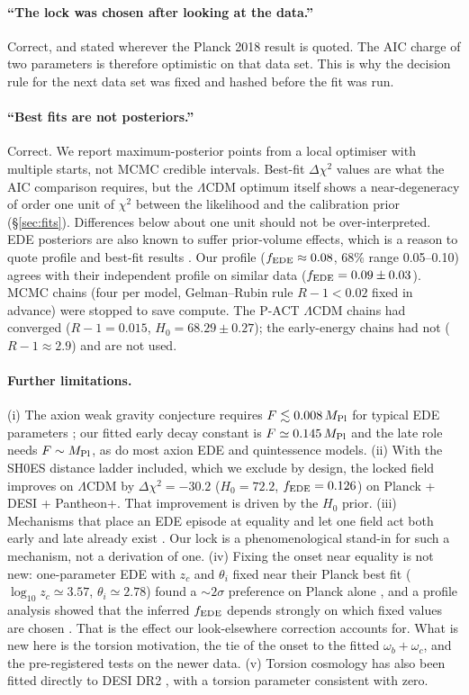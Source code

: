 \documentclass[11pt]{article}
\newcommand{\Mp}{M_{\rm Pl}}
\begin{document}
\paragraph{``The lock was chosen after looking at the data.''} Correct, and stated wherever
the Planck 2018 result is quoted. The AIC charge of two parameters is therefore optimistic
on that data set. This is why the decision rule for the next data set was fixed and hashed
before the fit was run.

\paragraph{``Best fits are not posteriors.''} Correct. We report maximum-posterior points
from a local optimiser with multiple starts, not MCMC credible intervals. Best-fit
$\Delta\chi^2$ values are what the AIC comparison requires, but the $\Lambda$CDM optimum
itself shows a near-degeneracy of order one unit of $\chi^2$ between the likelihood and the
calibration prior (\S\ref{sec:fits}). Differences below about one unit should not be
over-interpreted. EDE posteriors are also known to suffer prior-volume effects, which is a
reason to quote profile and best-fit results \cite{poulin2025}. Our profile ($f_{\rm EDE}\approx0.08$, 68\% range
0.05--0.10) agrees with their independent profile on similar data ($f_{\rm EDE}=0.09\pm0.03$). MCMC chains (four per
model, Gelman--Rubin rule $R-1<0.02$ fixed in advance) were stopped to save compute. The P-ACT $\Lambda$CDM chains had
converged ($R-1=0.015$, $H_0=68.29\pm0.27$); the early-energy chains had not ($R-1\approx2.9$) and are not used.

\paragraph{Further limitations.} (i) The axion weak gravity conjecture requires $F\lesssim0.008\,\Mp$ for typical
EDE parameters \cite{rudelius2022}; our fitted early decay constant is $F\simeq0.145\,\Mp$ and the late role needs
$F\sim\Mp$, as do most axion EDE and quintessence models. (ii) With the SH0ES distance ladder included, which we
exclude by design, the locked field improves on $\Lambda$CDM by $\Delta\chi^2=-30.2$ ($H_0=72.2$, $f_{\rm EDE}=0.126$)
on Planck + DESI + Pantheon+. That improvement is driven by the $H_0$ prior. (iii) Mechanisms that place an EDE
episode at equality and let one field act both early and late already exist \cite{ramadan2023,brissenden2023}. Our
lock is a phenomenological stand-in for such a mechanism, not a derivation of one. (iv) Fixing the onset near equality
is not new: one-parameter EDE with $z_c$ and $\theta_i$ fixed near their Planck best fit ($\log_{10}z_c\simeq3.57$,
$\theta_i\simeq2.78$) found a $\sim2\sigma$ preference on Planck alone \cite{murgia2021,smith2021}, and a profile
analysis showed that the inferred $f_{\rm EDE}$ depends strongly on which fixed values are chosen \cite{herold2022}.
That is the effect our look-elsewhere correction accounts for. What is new here is the torsion motivation, the tie of the
onset to the fitted $\omega_b+\omega_c$, and the pre-registered tests on the newer data. (v) Torsion cosmology has also
been fitted directly to DESI DR2 \cite{liu2025torsion}, with a torsion parameter consistent with zero.
\end{document}

